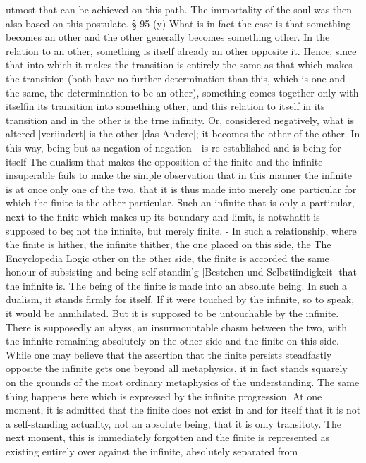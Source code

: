 utmost that can be achieved on this path. The immortality of the soul was then
also based on this postulate.
§ 95
(y) What is in fact the case is that something becomes an other and
the other generally becomes something other. In the relation to an other,
something is itself already an other opposite it. Hence, since that into
which it makes the transition is entirely the same as that which makes the
transition (both have no further determination than this, which is one and
the same, the determination to be an other), something comes together
only with itselfin its transition into something other, and this relation to
itself in its transition and in the other is the trne infinity. Or, considered
negatively, what is altered [veriindert] is the other [das Andere]; it becomes
the other of the other. In this way, being but as negation of negation - is
re-established and is being-for-itself
The dualism that makes the opposition of the finite and the infinite
insuperable fails to make the simple observation that in this manner
the infinite is at once only one of the two, that it is thus made into
merely one particular for which the finite is the other particular.
Such an infinite that is only a particular, next to the finite which
makes up its boundary and limit, is notwhatit is supposed to be;
not the infinite, but merely finite. - In such a relationship, where the
finite is hither, the infinite thither, the one placed on this side, the
The Encyclopedia Logic
other on the other side, the finite is accorded the same honour of
subsisting and being self-standin'g [Bestehen und Selbstiindigkeit] that
the infinite is. The being of the finite is made into an absolute being.
In such a dualism, it stands firmly for itself. If it were touched by the
infinite, so to speak, it would be annihilated. But it is supposed to be
untouchable by the infinite. There is supposedly an abyss, an
insurmountable chasm between the two, with the infinite remaining
absolutely on the other side and the finite on this side. While one
may believe that the assertion that the finite persists steadfastly
opposite the infinite gets one beyond all metaphysics, it in fact
stands squarely on the grounds of the most ordinary metaphysics of
the understanding. The same thing happens here which is expressed
by the infinite progression. At one moment, it is admitted that the
finite does not exist in and for itself that it is not a self-standing
actuality, not an absolute being, that it is only transitoty. The next
moment, this is immediately forgotten and the finite is represented
as existing entirely over against the infinite, absolutely separated from
